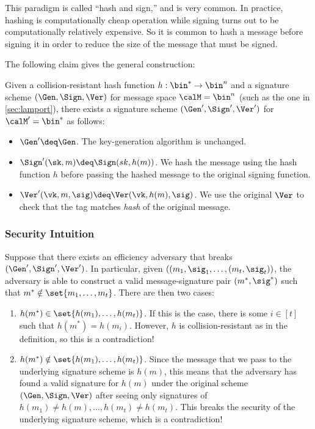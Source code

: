 This paradigm is called ``hash and sign,'' and is very common.
In practice, hashing is computationally cheap operation while signing turns out to be computationally relatively expensive.
So it is common to hash a message before signing it in order to reduce the size of the message that must be signed. 

The following claim gives the general construction: 

\begin{claim}
Given a collision-resistant hash function $h: \bin^* \rightarrow \bin^{n}$ and a signature scheme $(\Gen, \Sign, \Ver)$ for message space $\calM = \bin^n$ (such as the one in \cref{sec:lamport}), there exists a signature scheme $(\Gen', \Sign', \Ver')$ for $\calM' = \bin^*$ as follows:

\begin{itemize}
  \item $\Gen' \deq \Gen$. The key-generation algorithm is unchanged.
	\item $\Sign'(\sk, m) \deq \Sign(sk, h(m))$. We hash the message using the hash function $h$ before passing the hashed message to the original signing function.
	\item $\Ver'(\vk, m, \sig) \deq \Ver(\vk, h(m), \sig)$. We use the original $\Ver$ to check that the tag matches \emph{hash} of the original message.
\end{itemize}
\end{claim}

\subsubsection{Security Intuition}
Suppose that there exists an efficiency adversary that breaks $(\Gen', \Sign', \Ver')$.
In particular, given $((m_1, \sig_1, \ldots, (m_t, \sig_t))$, the adversary is able to construct a valid
message-signature pair $(m^*, \sig^*)$ such that $m^* \notin \set{m_1, \ldots, m_t}$.
There are then two cases: 

\begin{enumerate}
	\item $h(m^*) \in \set{h(m_1), \ldots, h(m_t)}$. If this is the case, there is some $i \in [t]$ such that $h(m^*) = h(m_i)$. However, $h$ is collision-resistant as in the definition, so this is a contradiction!
	\item $h(m^*) \notin \set{h(m_1), \ldots, h(m_t)}$. Since the message that we pass to the underlying signature scheme is $h(m)$, this means that the adversary has found a valid signature for $h(m)$ under the original scheme $(\Gen, \Sign, \Ver)$ after seeing only signatures of $h(m_1)\neq h(m), \ldots, h(m_t)\neq h(m_t)$. This breaks the security of the underlying signature scheme, which is a contradiction!
\end{enumerate}

